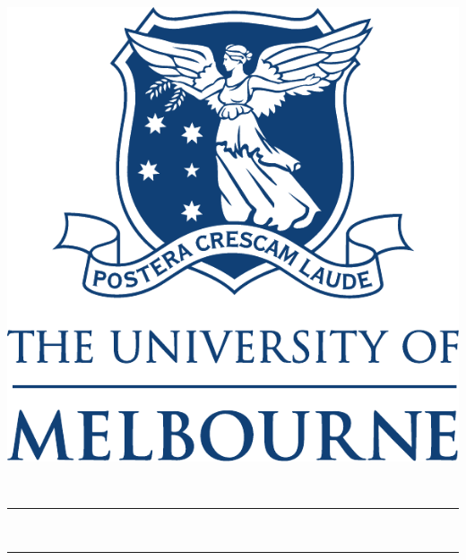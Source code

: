
\begin{titlepage}
	\begin{center} 
\begin{minipage}{0.75\textwidth}
\begin{flushleft}
\textsc{\myDepartment}\\
\textsc{\large \myUni}
\end{flushleft}
\end{minipage}
\begin{minipage}{0.2\textwidth}
\begin{flushright} 
\includegraphics[scale=0.25]{UniLogo}
\end{flushright}
\end{minipage}\\
\vspace{1cm}
\rule{150mm}{0.5mm}

\vspace{1cm}
        \begingroup
            \Large \bfseries
            \color{unimelb}\spacedallcaps{\myTitle} \\ \bigskip
        \endgroup
\vspace{.5cm}
\rule{150mm}{0.5mm}
\vspace{1.5cm}


\end{center}
\end{titlepage}
